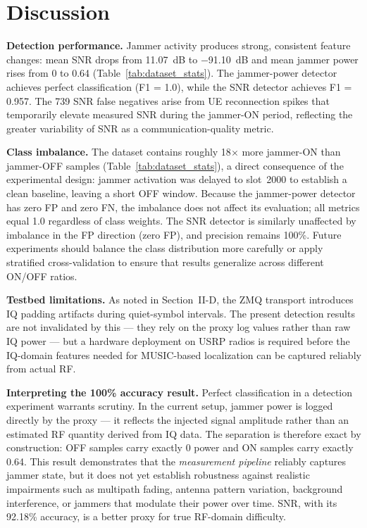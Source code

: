 \documentclass[conference]{IEEEtran}
\begin{document}
\section{Discussion}
\label{sec:discussion}

\textbf{Detection performance.}
Jammer activity produces strong, consistent feature changes: mean SNR
drops from 11.07~dB to $-$91.10~dB and mean jammer power rises from 0 to
0.64 (Table~\ref{tab:dataset_stats}). The jammer-power detector achieves
perfect classification (F1 = 1.0), while the SNR detector achieves F1 =
0.957. The 739 SNR false negatives arise from UE reconnection spikes that
temporarily elevate measured SNR during the jammer-ON period, reflecting
the greater variability of SNR as a communication-quality metric.

\textbf{Class imbalance.}
The dataset contains roughly 18$\times$ more jammer-ON than jammer-OFF
samples (Table~\ref{tab:dataset_stats}), a direct consequence of the
experimental design: jammer activation was delayed to slot~2000 to
establish a clean baseline, leaving a short OFF window. Because the
jammer-power detector has zero FP and zero FN, the imbalance does not
affect its evaluation; all metrics equal 1.0 regardless of class weights.
The SNR detector is similarly unaffected by imbalance in the FP direction
(zero FP), and precision remains 100\%. Future experiments should balance
the class distribution more carefully or apply stratified cross-validation
to ensure that results generalize across different ON/OFF ratios.



\textbf{Testbed limitations.}
As noted in Section~II-D, the ZMQ transport introduces IQ padding
artifacts during quiet-symbol intervals. The present detection results
are not invalidated by this — they rely on the proxy log values rather
than raw IQ power — but a hardware deployment on USRP radios is required
before the IQ-domain features needed for MUSIC-based localization can be
captured reliably from actual RF.


\textbf{Interpreting the 100\% accuracy result.}
Perfect classification in a detection experiment warrants scrutiny. In
the current setup, jammer power is logged directly by the proxy — it
reflects the injected signal amplitude rather than an estimated RF
quantity derived from IQ data. The separation is therefore exact by
construction: OFF samples carry exactly 0 power and ON samples carry
exactly 0.64. This result demonstrates that the \emph{measurement
pipeline} reliably captures jammer state, but it does not yet establish
robustness against realistic impairments such as multipath fading,
antenna pattern variation, background interference, or jammers that
modulate their power over time. SNR, with its 92.18\% accuracy, is a
better proxy for true RF-domain difficulty.
\end{document}
